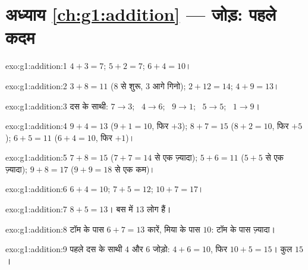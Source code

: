 \section*{अध्याय \ref{ch:g1:addition} --- जोड़: पहले कदम}

\begin{solution}{exo:g1:addition:1}
$4 + 3 = 7$; \quad $5 + 2 = 7$; \quad $6 + 4 = 10$।
\end{solution}

\begin{solution}{exo:g1:addition:2}
$3 + 8 = 11$ ($8$ से शुरू, $3$ आगे गिनो); \quad
$2 + 12 = 14$; \quad $4 + 9 = 13$।
\end{solution}

\begin{solution}{exo:g1:addition:3}
दस के साथी: $7 \to 3$; \ $4 \to 6$; \ $9 \to 1$; \ $5 \to 5$;
\ $1 \to 9$।
\end{solution}

\begin{solution}{exo:g1:addition:4}
$9 + 4 = 13$ ($9 + 1 = 10$, फिर $+3$); \quad
$8 + 7 = 15$ ($8 + 2 = 10$, फिर $+5$); \quad
$6 + 5 = 11$ ($6 + 4 = 10$, फिर $+1$)।
\end{solution}

\begin{solution}{exo:g1:addition:5}
$7 + 8 = 15$ ($7 + 7 = 14$ से एक ज़्यादा); \quad
$5 + 6 = 11$ ($5 + 5$ से एक ज़्यादा); \quad
$9 + 8 = 17$ ($9 + 9 = 18$ से एक कम)।
\end{solution}

\begin{solution}{exo:g1:addition:6}
$6 + 4 = 10$; \quad $7 + 5 = 12$; \quad $10 + 7 = 17$।
\end{solution}

\begin{solution}{exo:g1:addition:7}
$8 + 5 = 13$। बस में $13$ लोग हैं।
\end{solution}

\begin{solution}{exo:g1:addition:8}
टॉम के पास $6 + 7 = 13$ कारें, मिया के पास $10$: टॉम के पास ज़्यादा।
\end{solution}

\begin{solution}{exo:g1:addition:9}
पहले दस के साथी $4$ और $6$ जोड़ो: $4 + 6 = 10$, फिर
$10 + 5 = 15$। कुल $15$।
\end{solution}
